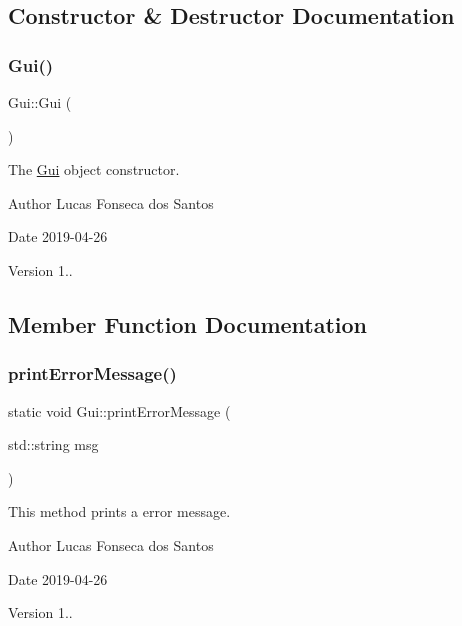 \subsection{Constructor \& Destructor Documentation}
\mbox{\label{classGui_ab2655dbb6d3a91d7e90cb83dad6c0450}} 
\subsubsection{\texorpdfstring{Gui()}{Gui()}}
{\footnotesize\ttfamily Gui\+::\+Gui (\begin{DoxyParamCaption}{ }\end{DoxyParamCaption})}

The \mbox{\hyperlink{classGui}{Gui}} object constructor. \begin{DoxyAuthor}{Author}
Lucas Fonseca dos Santos 
\end{DoxyAuthor}
\begin{DoxyDate}{Date}
2019-\/04-\/26 
\end{DoxyDate}
\begin{DoxyVersion}{Version}
1.. 
\end{DoxyVersion}


\subsection{Member Function Documentation}
\mbox{\label{classGui_ad51e4b65b71248dd6b82d1fc8518f7d3}} 
\subsubsection{\texorpdfstring{print\+Error\+Message()}{printErrorMessage()}}
{\footnotesize\ttfamily static void Gui\+::print\+Error\+Message (\begin{DoxyParamCaption}\item[{std\+::string}]{msg }\end{DoxyParamCaption})\hspace{0.3cm}{\ttfamily [static]}}

This method prints a error message. \begin{DoxyAuthor}{Author}
Lucas Fonseca dos Santos 
\end{DoxyAuthor}
\begin{DoxyDate}{Date}
2019-\/04-\/26 
\end{DoxyDate}
\begin{DoxyVersion}{Version}
1..
\end{DoxyVersion}

